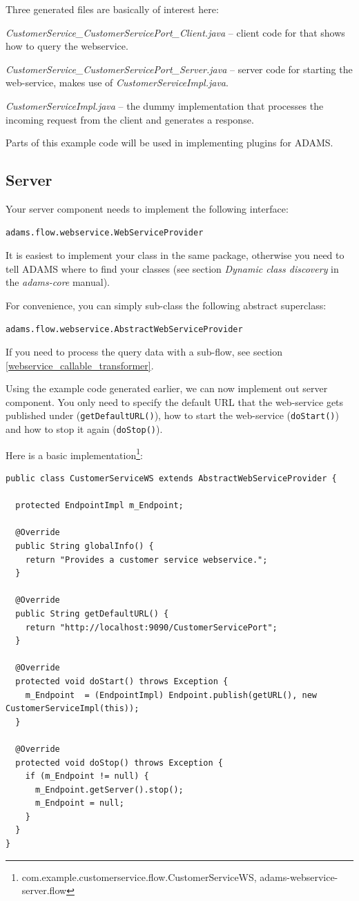 \documentclass[a4paper]{book}
\begin{document}
Three generated files are basically of interest here:
\begin{tight_itemize}
	\item \textit{CustomerService\_CustomerServicePort\_Client.java} -- client
	code for that shows how to query the webservice.
	\item \textit{CustomerService\_CustomerServicePort\_Server.java} -- server
	code for starting the web-service, makes use of \textit{CustomerServiceImpl.java}.
	\item \textit{CustomerServiceImpl.java} -- the dummy implementation that
	processes the incoming request from the client and generates a response.
\end{tight_itemize}
Parts of this example code will be used in implementing plugins for ADAMS.

\subsection{Server}
Your server component needs to implement the following interface:
\begin{verbatim}
adams.flow.webservice.WebServiceProvider
\end{verbatim}
It is easiest to implement your class in the same package, otherwise you need
to tell ADAMS where to find your classes (see section \textit{Dynamic class 
discovery} in the \textit{adams-core} manual).

For convenience, you can simply sub-class the following abstract superclass:
\begin{verbatim}
adams.flow.webservice.AbstractWebServiceProvider
\end{verbatim}
If you need to process the query data with a sub-flow, see section 
\ref{webservice_callable_transformer}.

Using the example code generated earlier, we can now implement out server
component. You only need to specify the default URL that the web-service
gets published under (\texttt{getDefaultURL()}), how to start the web-service
(\texttt{doStart()}) and how to stop it again (\texttt{doStop()}).

Here is a basic implementation\footnote{com.example.customerservice.flow.CustomerServiceWS,
adams-webservice-server.flow}:
{\scriptsize
\begin{verbatim}
public class CustomerServiceWS extends AbstractWebServiceProvider {

  protected EndpointImpl m_Endpoint;
  
  @Override
  public String globalInfo() {
    return "Provides a customer service webservice.";
  }

  @Override
  public String getDefaultURL() {
    return "http://localhost:9090/CustomerServicePort";
  }

  @Override
  protected void doStart() throws Exception {
    m_Endpoint  = (EndpointImpl) Endpoint.publish(getURL(), new CustomerServiceImpl(this));
  }

  @Override
  protected void doStop() throws Exception {
    if (m_Endpoint != null) {
      m_Endpoint.getServer().stop();
      m_Endpoint = null;
    }
  }
}
\end{verbatim}}
\end{document}
